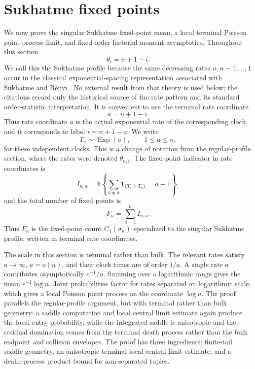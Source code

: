 \documentclass[11pt]{article}
\theoremstyle{remark}
\newcommand{\one}{\mathbf 1}
\newcommand{\Exp}{\operatorname{Exp}}
\begin{document}
\section{Sukhatme fixed points}

We now prove the singular Sukhatme fixed-point mean, a local terminal Poisson point-process limit, and fixed-order factorial moment asymptotics.  Throughout this section
\[
        \theta_i=n+1-i.
\]
We call this the Sukhatme profile because the same decreasing rates \(n,n-1,\ldots,1\) occur in the classical exponential-spacing representation associated with Sukhatme and R\'enyi \cite{Sukhatme1937,Renyi1953}.  No external result from that theory is used below; the citations record only the historical source of the rate pattern and its standard order-statistic interpretation.
It is convenient to use the terminal rate coordinate
\[
        a=n+1-i.
\]
Thus rate coordinate \(a\) is the actual exponential rate of the corresponding clock, and it corresponds to label \(i=n+1-a\).  We write
\[
        T_a\sim\Exp(a),\qquad 1\le a\le n,
\]
for these independent clocks.  This is a change of notation from the regular-profile section, where the rates were denoted \(\theta_{n,i}\).  The fixed-point indicator in rate coordinates is
\[
        I_{n,a}=\one\left\{
        \sum_{b\ne a}\one_{\{T_b>T_a\}}=a-1
        \right\},
\]
and the total number of fixed points is
\[
        F_n=\sum_{a=1}^n I_{n,a}.
\]
Thus \(F_n\) is the fixed-point count \(C_1(\sigma_n)\) specialized to the singular Sukhatme profile, written in terminal rate coordinates.

The scale in this section is terminal rather than bulk.  The relevant rates satisfy
\(a\to\infty\), \(a=o(n)\), and their clock times are of order \(1/a\).  A single rate \(a\) contributes asymptotically \(e^{-1}/a\).  Summing over a logarithmic range gives the mean \(e^{-1}\log n\).  Joint probabilities factor for rates separated on logarithmic scale, which gives a local Poisson point process on the coordinate \(\log a\).  The proof parallels the regular-profile argument, but with terminal rather than bulk geometry: a saddle computation and local central limit estimate again produce the local entry probability, while the integrated saddle is anisotropic and the residual domination comes from the terminal death process rather than the bulk endpoint and collision envelopes.  The proof has three ingredients: finite-tail saddle geometry, an anisotropic terminal local central limit estimate, and a death-process product bound for non-separated tuples.
\end{document}
